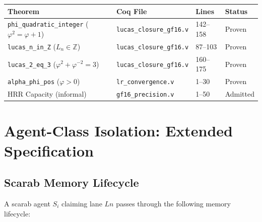 \begin{center}
\begin{tabular}{llll}
\hline
\textbf{Theorem} & \textbf{Coq File} & \textbf{Lines} &
\textbf{Status} \\
\hline
\texttt{phi\_quadratic\_integer} ($\varphi^2 = \varphi+1$) &
  \texttt{lucas\_closure\_gf16.v} & 142--158 & Proven \\
\texttt{lucas\_n\_in\_Z} ($L_n \in \mathbb{Z}$) &
  \texttt{lucas\_closure\_gf16.v} & 87--103 & Proven \\
\texttt{lucas\_2\_eq\_3} ($\varphi^2 + \varphi^{-2} = 3$) &
  \texttt{lucas\_closure\_gf16.v} & 160--175 & Proven \\
\texttt{alpha\_phi\_pos} ($\varphi > 0$) &
  \texttt{lr\_convergence.v} & 1--30 & Proven \\
HRR Capacity (informal) &
  \texttt{gf16\_precision.v} & 1--50 & Admitted \\
\hline
\end{tabular}
\end{center}



\section{Agent-Class Isolation: Extended Specification}
\label{sec:K-isolation-extended}

\subsection{Scarab Memory Lifecycle}
\label{ssec:K-scarab-lifecycle}

A scarab agent $S_i$ claiming lane $Ln$ passes through the following
memory lifecycle:

